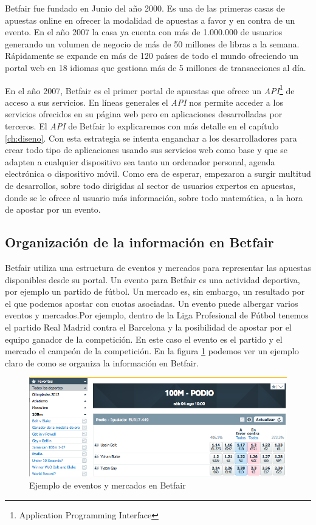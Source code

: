  Betfair fue fundado en Junio del año 2000. Es una de las primeras casas de apuestas online en ofrecer la modalidad de apuestas a favor y en contra de un evento. En el año 2007 la casa ya cuenta con más de 1.000.000 de usuarios generando un volumen de negocio de más de 50 millones de libras a la semana. Rápidamente se expande en más de 120 países de todo el mundo ofreciendo un portal web en 18 idiomas que gestiona más de 5 millones de transacciones al día. 

En el año 2007, Betfair es el primer portal de apuestas que ofrece un \emph{API}\footnote{Application Programming Interface} de acceso a sus servicios. En líneas generales el \emph{API} nos permite acceder a los servicios ofrecidos en su página web pero en aplicaciones desarrolladas por terceros. El \emph{API} de Betfair lo explicaremos con más detalle en el capítulo \ref{ch:diseno}. Con esta estrategia se intenta enganchar a los desarrolladores para crear todo tipo de aplicaciones usando sus servicios web como base y que se adapten a cualquier dispositivo sea tanto un ordenador personal, agenda electrónica o dispositivo móvil. Como era de esperar, empezaron a surgir multitud de desarrollos, sobre todo dirigidas al sector de usuarios expertos en apuestas, donde se le ofrece al usuario más información, sobre todo matemática, a la hora de apostar por un evento.

\subsection{Organización de la información en Betfair}

 Betfair utiliza una estructura de eventos y mercados para representar las apuestas disponibles desde su portal. Un evento para Betfair es una actividad deportiva, por ejemplo un partido de fútbol. Un mercado es, sin embargo, un resultado por el que podemos apostar con cuotas asociadas. Un evento puede albergar varios eventos y mercados.Por ejemplo, dentro de la Liga Profesional de Fútbol tenemos el partido Real Madrid contra el Barcelona y la posibilidad de apostar por el equipo ganador de la competición. En este caso el evento es el partido y el mercado el campeón de la competición. En la figura \ref{fig:eventoymercado} podemos ver un ejemplo claro de como se organiza la información en Betfair.
 
 \begin{figure} [h]
  \centering
    \includegraphics[width=0.95\linewidth]{./images/introbetfair.png} 
  \caption{Ejemplo de eventos y mercados en Betfair}
  \label{fig:eventoymercado}
\end{figure}

